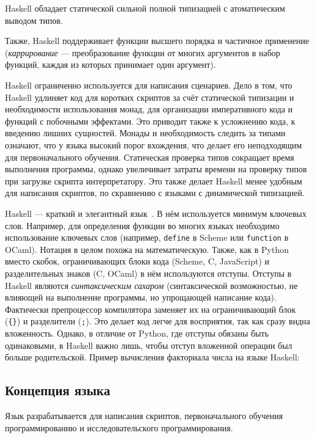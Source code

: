        Haskell обладает статической сильной полной типизацией с атоматическим выводом типов.
        
        Также, Haskell поддерживает функции высшего порядка и частичное применение (\textit{каррирование} --- преобразование функции от многих аргументов в набор функций, каждая из которых принимает один аргумент).

        Haskell ограниченно используется для написания сценариев.
        Дело в том, что Haskell удлиняет код для коротких скриптов за счёт статической типизации и необходимости использования монад, для организации императивного кода и функций с побочными эффектами.
        Это приводит также к усложнению кода, к введению лишних сущностей.
        Монады и необходимость следить за типами означают, что у языка высокий порог вхождения, что делает его неподходящим для первоначального обучения.
        Статическая проверка типов сокращает время выполнения программы, однако увеличивает затраты времени на проверку типов при загрузке скрипта интерпретатору.
        Это также делает Haskell менее удобным для написания скриптов, по скравнению с языками с динамической типизацией.

        Haskell --- краткий и элегантный язык~\cite{haskell}.
        В нём используется минимум ключевых слов.
        Например, для определения функции во многих языках необходимо использование ключевых слов (например, \verb!define! в Scheme или \verb!function! в OCaml).
        Нотация в целом похожа на математическую.
        Также, как в Python вместо скобок, ограничивающих блоки кода (Scheme, C, JavaScript) и разделительных знаков (C, OCaml) в нём используются отступы.
        Отступы в Haskell являются \textit{синтаксическим сахаром} (синтаксической возможностью, не влияющей на выполнение программы, но упрощающей написание кода).
        Фактически препроцессор компилятора заменяет их на ограничивающий блок (\verb${}$) и разделители (\verb$;$).
        Это делает код легче для восприятия, так как сразу видна вложенность.
        Однако, в отличие от Python, где отступы обязаны быть одинаковыми, в Haskell важно лишь, чтобы отступ вложенной операции был больше родительской.
        \clearpage
        Пример вычисления факториала числа на языке Haskell:

        

    \subsection{Концепция языка}
        Язык разрабатывается для написания скриптов, первоначального обучения программированию и исследовательского программирования.

